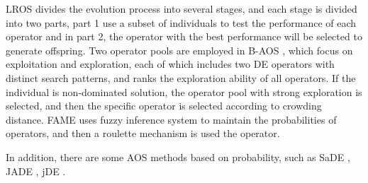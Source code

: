 \documentclass[journal]{IEEEtran}
\begin{document}
LROS \cite{lros} divides the evolution process into several stages, and each stage is divided into two parts, part 1 use a subset of individuals to test the performance of each operator and in part 2, the operator with the best performance will be selected to generate offspring.
Two operator pools are employed in B-AOS \cite{lin2021decomposition}, which focus on exploitation and exploration, each of which includes two DE operators with distinct search patterns, and ranks the exploration ability of all operators. If the individual is non-dominated solution, the operator pool with strong exploration is selected, and then the specific operator is selected according to crowding distance.
FAME \cite{fame} uses fuzzy inference system to maintain the probabilities of operators, and then a roulette mechanism is used the operator.

In addition, there are some AOS methods based on probability, such as SaDE \cite{sade}, JADE \cite{jade}, jDE \cite{jde}.
\end{document}
